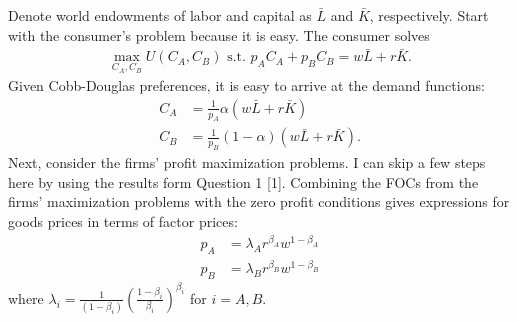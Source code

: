 \documentclass[12pt]{article}
\begin{document}
Denote world endowments of labor and capital as $\bar L$ and $\bar K$, respectively. Start with the consumer's problem because it is easy. The consumer solves
\begin{align*}
\max_{C_A,C_B} U(C_A, C_B) \text{ s.t. } p_AC_A + p_BC_B = w\bar L + r\bar K.
\end{align*}
Given Cobb-Douglas preferences, it is easy to arrive at the demand functions:
\begin{align}
C_A &= \frac{1}{p_A} \alpha (w\bar L + r\bar K) \label{eq:HO1}\\
C_B &= \frac{1}{p_B} (1-\alpha) (w\bar L + r\bar K). \label{eq:HO2}
\end{align}
Next, consider the firms' profit maximization problems. I can skip a few steps here by using the results form Question 1 [1]. Combining the FOCs from the firms' maximization problems with the zero profit conditions gives expressions for goods prices in terms of factor prices:
\begin{align}
p_A &= \lambda_A r^{\beta_A}w^{1-\beta_A} \label{eq:HO3}\\
p_B &= \lambda_B r^{\beta_B}w^{1-\beta_B} \label{eq:HO4}
\end{align}
where $\lambda_i =  \frac{1}{(1-\beta_i)}\left(\frac{1-\beta_i}{\beta_i}\right)^{\beta_i}$ for $i = A,B$.\\
\end{document}
